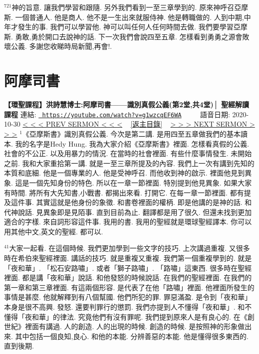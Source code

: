 \documentclass{book}
\begin{document}
$^{721}$神的旨意.
讓我們學習和跟隨.
另外我們看到一至三章學到的.
原來神呼召亞摩斯.
一個普通人.
他是商人.
他不是一生出來就服侍神.
他是轉職做的.
人到中期,中年才發生的事.
我們可以學習他.
神可以叫任何人任何時間去做.
我們要學習亞摩斯.
勇敢,勇於開口去說神的話.
下一次我們會說四至五章.
怎樣看到勇勇之源會敗壞公義.
多謝您收睇時局新聞,再會!.
\newpage



\section{阿摩司書}
\label{sec:g1wzcqEF6WA}
\textbf{【環聖課程】洪詩慧博士:阿摩司書——識別真假公義(第2堂,共4堂)│ 聖經解讀課程}
\newline
\newline
連結: \href{https://youtube.com/watch?v=g1wzcqEF6WA}{\texttt{ https://youtube.com/watch?v=g1wzcqEF6WA}} ~~~~ 語音日期: 2020-10-30 
\newline
\newline
\hyperref[sec:ECCsRtsc_50]{\small{< < < PREV SERMON < < <}}
~
\hyperref[sec:index]{\small{[返主目錄]}}
~
\hyperref[sec:3OmAEo3dSsg]{\small{> > > NEXT SERMON > > >}}
\newline
\newline
$^{1}$《亞摩斯書》識別真假公義.
今次是第二講.
是用四至五章做我們的基本讀本.
我的名字是Hedy Hung.
我為大家介紹《亞摩斯書》裡面.
怎樣看真假的公義.
社會的不公正.
以及用暴力的情況.
在當時的社會裡面.
有些什麼事情發生.
未開始之前.
我和大家重拾第一講.
就是一至三章所提及的內容.
我們上一次有講到先知的本質和底細.
他是一個專業的人.
他是受神呼召.
而他收到神的啟示.
裡面他見到異象.
這是一個先知身份的特色.
所以在一章一節裡面.
特別提到他見異象.
如果大家有時間.
將所有大先知書,小戰書.
都揭出來看.
打開它.
在每一章一節裡面.
都有提及這件事.
其實這就是他身份的象徵.
和書卷裡面的權柄.
即是他講的是神的話.
和代神說話.
見異象即是見陌事.
直到目前為止.
翻譯都是用了很久.
但還未找到更加適合的字樣.
來自詞形容這件事.
我用的書.
我用的聖經就是環球聖經譯本.
你可以用其他中文,英文的聖經.
都可以.

$^{41}$大家一起看.
在這個時候.
我們更加學到一些文字的技巧.
上次講過重複.
又很多時在希伯來聖經裡面.
講話的技巧.
就是重複又重複.
我們第一個重複學到的.
就是「夜和華」.
「松石安路嘯」.
或者「獅子路嘯」.
「路嘯」這東西.
很多時在聖經裡面.
都是講「夜和華」說話.
和他發怒的時候說話.
在我們的聖經裡面.
在我們的第一章和第三章裡面.
有這兩個形容.
是代表了在他「路嘯」裡面.
他裡面所發生的事情是甚麼.
他就解釋到有八個幫國.
他們所犯的罪.
罪惡滿盈.
是令到「夜和華」本身是很不高興.
發怒.
還要判罪行的懲罰.
我們亦提到人不懂得「夜和華」.
和不懂得「夜和華」的律法.
究竟他們有沒有罪呢.
我們提到原來人是有良心的.
在《創世紀》裡面有講過.
人的創造.
人的出現的時候.
創造的時候.
是按照神的形象做出來.
其中包括一個良知,良心.
和他的本能.
分辨善惡的本能.
他是懂得很多東西的.
直到後期.
\end{document}
